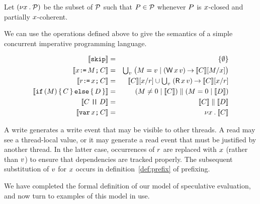 \begin{definition}
Let $(\nu x\mathbin.\mathcal{P})$ be the subset of $\mathcal{P}$ such that $P\in\mathcal{P}$ whenever
$P$ is $x$-closed and partially $x$-coherent.
\end{definition}

We can use the operations defined above to give the
semantics of a simple concurrent imperative programming language.

\begin{definition}
  \label{def:programs}
\begin{eqnarray*}
  \sem{\SKIP} & = & \{ \emptyset \} \\
  \sem{\aLoc\GETS\aExp\SEMI \aCmd} & = & \textstyle\bigcup_\aVal\; \bigl(\aExp=\aVal \mid (\DW\aLoc\aVal) \prefix \sem{\aCmd}[\aExp/\aLoc]\bigr) \\
  \sem{\aReg\GETS\aLoc\SEMI \aCmd} & = & \sem{\aCmd}[\aLoc/\aReg] \cup \textstyle\bigcup_\aVal\; (\DR\aLoc\aVal) \prefix \sem{\aCmd}[\aLoc/\aReg] \\
  \sem{\IF (\aExp) \THEN \aCmd \ELSE \bCmd \FI} & = & (\aExp \neq 0 \mid \sem{\aCmd}) \parallel (\aExp=0 \mid \sem{\bCmd}) \\
  \sem{\aCmd \PAR \bCmd} & = & \sem{\aCmd} \parallel \sem{\bCmd} \\
  \sem{\VAR\aLoc\SEMI \aCmd} & = & \nu \aLoc \st \sem{\aCmd}
\end{eqnarray*}
\end{definition}

A write generates a write event that may be visible
to other threads.  A read may see a
thread-local value, or it may generate a read event that must be justified by
another thread.  In the latter case, occurrences of $r$ are replaced with
$x$ (rather than $v$) to ensure that dependencies are tracked
properly.  The subsequent substitution of $v$ for $x$ occurs in
definition~\ref{def:prefix} of prefixing.

We have completed the formal definition of our model of speculative
evaluation, and now turn to examples of this model in use.
